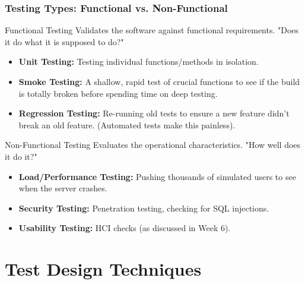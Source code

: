 \documentclass[xcolor=table]{beamer}
\begin{document}
\begin{frame}
    \frametitle{Testing Types: Functional vs. Non-Functional}
    \footnotesize    
    \begin{block}{Functional Testing}
        Validates the software against functional requirements. "Does it do what it is supposed to do?"
        \begin{itemize}
            \item \textbf{Unit Testing:} Testing individual functions/methods in isolation.
            \item \textbf{Smoke Testing:} A shallow, rapid test of crucial functions to see if the build is totally broken before spending time on deep testing.
            \item \textbf{Regression Testing:} Re-running old tests to ensure a new feature didn't break an old feature. (Automated tests make this painless).
        \end{itemize}
    \end{block}
    
    \begin{block}{Non-Functional Testing}
        Evaluates the operational characteristics. "How well does it do it?"
        \begin{itemize}
            \item \textbf{Load/Performance Testing:} Pushing thousands of simulated users to see when the server crashes.
            \item \textbf{Security Testing:} Penetration testing, checking for SQL injections.
            \item \textbf{Usability Testing:} HCI checks (as discussed in Week 6).
        \end{itemize}
    \end{block}
\end{frame}


\section{Test Design Techniques}
\end{document}
